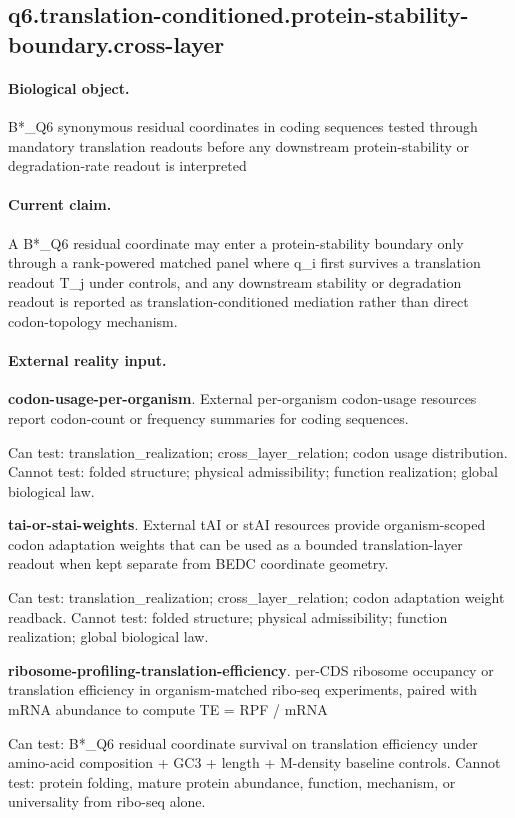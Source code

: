 \subsection{q6.translation-conditioned.protein-stability-boundary.cross-layer}

\paragraph{Biological object.} B*\_Q6 synonymous residual coordinates in coding sequences tested through mandatory translation readouts before any downstream protein-stability or degradation-rate readout is interpreted

\paragraph{Current claim.} A B*\_Q6 residual coordinate may enter a protein-stability boundary only through a rank-powered matched panel where q\_i first survives a translation readout T\_j under controls, and any downstream stability or degradation readout is reported as translation-conditioned mediation rather than direct codon-topology mechanism.

\paragraph{External reality input.}
\textbf{codon-usage-per-organism}. External per-organism codon-usage resources report codon-count or frequency summaries for coding sequences.

Can test: translation\_realization; cross\_layer\_relation; codon usage distribution. Cannot test: folded structure; physical admissibility; function realization; global biological law.

\textbf{tai-or-stai-weights}. External tAI or stAI resources provide organism-scoped codon adaptation weights that can be used as a bounded translation-layer readout when kept separate from BEDC coordinate geometry.

Can test: translation\_realization; cross\_layer\_relation; codon adaptation weight readback. Cannot test: folded structure; physical admissibility; function realization; global biological law.

\textbf{ribosome-profiling-translation-efficiency}. per-CDS ribosome occupancy or translation efficiency in organism-matched ribo-seq experiments, paired with mRNA abundance to compute TE = RPF / mRNA

Can test: B*\_Q6 residual coordinate survival on translation efficiency under amino-acid composition + GC3 + length + M-density baseline controls. Cannot test: protein folding, mature protein abundance, function, mechanism, or universality from ribo-seq alone.

